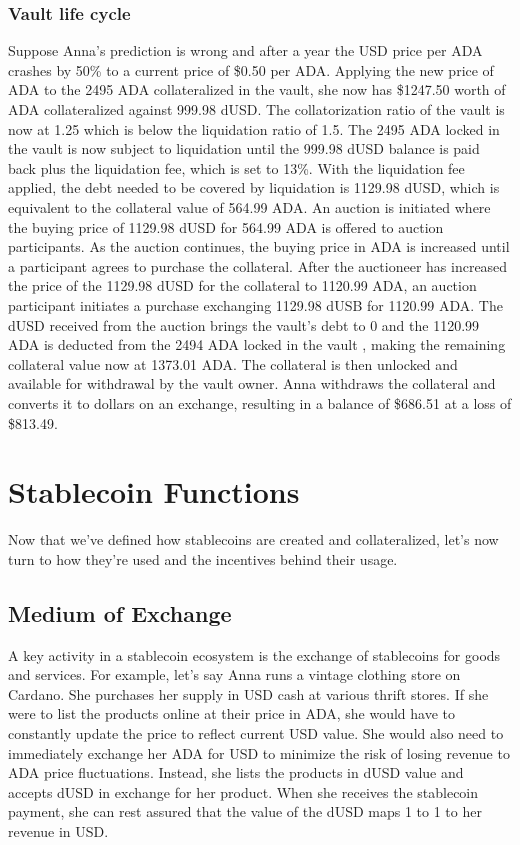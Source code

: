 \documentclass[12pt]{article}
\begin{document}
	\subsubsection{Vault life cycle}

Suppose Anna's prediction is wrong and after a year the USD price per ADA crashes by 50\% to a current price of \$0.50 per ADA. Applying the new price of ADA to the 2495 ADA collateralized in the vault, she now has \$1247.50 worth of ADA collateralized against 999.98 dUSD. The collatorization ratio of the vault is now at 1.25 which is below the liquidation ratio of 1.5. The 2495 ADA locked in the vault is now subject to liquidation until the 999.98 dUSD balance is paid back plus the liquidation fee, which is set to 13\%. With the liquidation fee applied, the debt needed to be covered by liquidation is 1129.98 dUSD, which is equivalent to the collateral value of 564.99 ADA. An auction is initiated where the buying price of 1129.98 dUSD for 564.99 ADA is offered to auction participants. As the auction continues, the buying price in ADA is increased until a participant agrees to purchase the collateral. After the auctioneer has increased the price of the 1129.98 dUSD for the collateral to 1120.99 ADA, an auction participant initiates a purchase exchanging 1129.98 dUSB for 1120.99 ADA. The dUSD received from the auction brings the vault's debt to 0 and the 1120.99 ADA is deducted from the 2494 ADA locked in the vault , making the remaining collateral value now at 1373.01 ADA. The collateral is then unlocked and available for withdrawal by the vault owner. Anna withdraws the collateral and converts it to dollars on an exchange, resulting in a balance of \$686.51 at a loss of \$813.49.

\section{Stablecoin Functions}

Now that we've defined how stablecoins are created and collateralized, let's now turn to how they're used and the incentives behind their usage.

\subsection{Medium of Exchange}

A key activity in a stablecoin ecosystem is the exchange of stablecoins for goods and services. For example, let's say Anna runs a vintage clothing store on Cardano. She purchases her supply in USD cash at various thrift stores. If she were to list the products online at their price in ADA, she would have to constantly update the price to reflect current USD value. She would also need to immediately exchange her ADA for USD to minimize the risk of losing revenue to ADA price fluctuations. Instead, she lists the products in dUSD value and accepts dUSD in exchange for her product. When she receives the stablecoin payment, she can rest assured that the value of the dUSD maps 1 to 1 to her revenue in USD.
\end{document}
